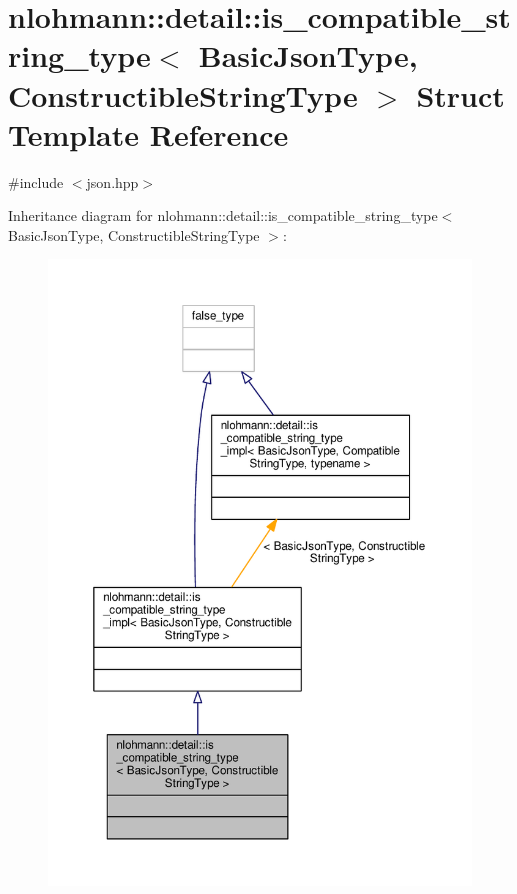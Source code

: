 \hypertarget{structnlohmann_1_1detail_1_1is__compatible__string__type}{}\section{nlohmann\+:\+:detail\+:\+:is\+\_\+compatible\+\_\+string\+\_\+type$<$ Basic\+Json\+Type, Constructible\+String\+Type $>$ Struct Template Reference}
\label{structnlohmann_1_1detail_1_1is__compatible__string__type}


{\ttfamily \#include $<$json.\+hpp$>$}



Inheritance diagram for nlohmann\+:\+:detail\+:\+:is\+\_\+compatible\+\_\+string\+\_\+type$<$ Basic\+Json\+Type, Constructible\+String\+Type $>$\+:
\nopagebreak
\begin{figure}[H]
\begin{center}
\leavevmode
\includegraphics[width=350pt]{structnlohmann_1_1detail_1_1is__compatible__string__type__inherit__graph}
\end{center}
\end{figure}


